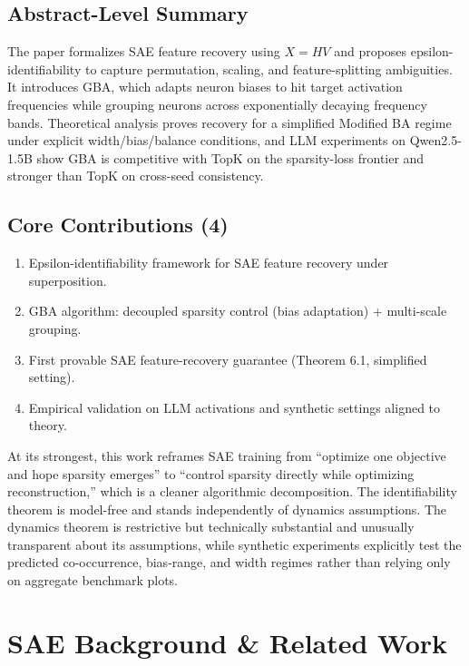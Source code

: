 \documentclass[11pt,a4paper]{article}
\begin{document}
\subsection*{Abstract-Level Summary}
The paper formalizes SAE feature recovery using $X=HV$ and proposes epsilon-identifiability to capture permutation, scaling, and feature-splitting ambiguities. It introduces GBA, which adapts neuron biases to hit target activation frequencies while grouping neurons across exponentially decaying frequency bands. Theoretical analysis proves recovery for a simplified Modified BA regime under explicit width/bias/balance conditions, and LLM experiments on Qwen2.5-1.5B show GBA is competitive with TopK on the sparsity-loss frontier and stronger than TopK on cross-seed consistency.

\subsection*{Core Contributions (4)}
\begin{enumerate}[leftmargin=*]
\item Epsilon-identifiability framework for SAE feature recovery under superposition.
\item GBA algorithm: decoupled sparsity control (bias adaptation) + multi-scale grouping.
\item First provable SAE feature-recovery guarantee (Theorem 6.1, simplified setting).
\item Empirical validation on LLM activations and synthetic settings aligned to theory.
\end{enumerate}

\begin{insightbox}
At its strongest, this work reframes SAE training from ``optimize one objective and hope sparsity emerges'' to ``control sparsity directly while optimizing reconstruction,'' which is a cleaner algorithmic decomposition. The identifiability theorem is model-free and stands independently of dynamics assumptions. The dynamics theorem is restrictive but technically substantial and unusually transparent about its assumptions, while synthetic experiments explicitly test the predicted co-occurrence, bias-range, and width regimes rather than relying only on aggregate benchmark plots.
\end{insightbox}

\section{SAE Background \& Related Work}
\end{document}

